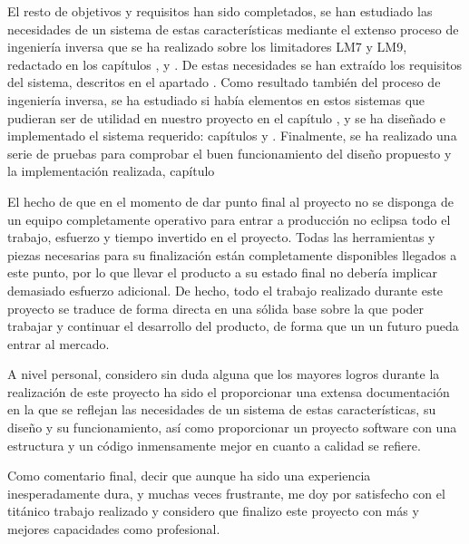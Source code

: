 El resto de objetivos y requisitos han sido completados, se han estudiado las necesidades de un sistema de estas características mediante el extenso proceso de ingeniería inversa que se ha realizado sobre los limitadores \acrshort{LM7} y \acrshort{LM9}, redactado en los capítulos ,  y . De estas necesidades se han extraído los requisitos del sistema, descritos en el apartado . Como resultado también del proceso de ingeniería inversa, se ha estudiado si había elementos en estos sistemas que pudieran ser de utilidad en nuestro proyecto en el capítulo , y se ha diseñado e implementado el sistema requerido: capítulos  y . Finalmente, se ha realizado una serie de pruebas para comprobar el buen funcionamiento del diseño propuesto y la implementación realizada, capítulo 

El hecho de que en el momento de dar punto final al proyecto no se disponga de un equipo completamente operativo para entrar a producción no eclipsa todo el trabajo, esfuerzo y tiempo invertido en el proyecto. Todas las herramientas y piezas necesarias para su finalización están completamente disponibles llegados a este punto, por lo que llevar el producto a su estado final no debería implicar demasiado esfuerzo adicional. De hecho, todo el trabajo realizado durante este proyecto se traduce de forma directa en una sólida base sobre la que poder trabajar y continuar el desarrollo del producto, de forma que un un futuro pueda entrar al mercado.

A nivel personal, considero sin duda alguna que los mayores logros durante la realización de este proyecto ha sido el proporcionar una extensa documentación en la que se reflejan las necesidades de un sistema de estas características, su diseño y su funcionamiento, así como proporcionar un proyecto software con una estructura y un código inmensamente mejor en cuanto a calidad se refiere.

Como comentario final, decir que aunque ha sido una experiencia inesperadamente dura, y muchas veces frustrante, me doy por satisfecho con el titánico trabajo realizado y considero que finalizo este proyecto con más y mejores capacidades como profesional.